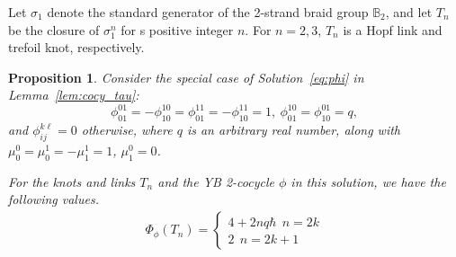 \documentclass[11pt,fleqn]{amsart} %
\newtheorem{proposition}[theorem]{Proposition}
\begin{document}
		
		Let $\sigma_1$ denote the standard generator of the 2-strand braid group ${\mathbb B}_2$,
and let $T_n$ be the closure of $\sigma_1^n$ for s positive integer $n$.
For $n=2,3$, $T_n$ is a Hopf link and trefoil knot, respectively. 
	

\begin{proposition}\label{prop:Tn}
Consider the special case of  Solution~\eqref{eq:phi} in Lemma~\ref{lem:cocy_tau}:
 $$\phi_{01}^{01} = -\phi_{10}^{10} = \phi_{01}^{11} = - \phi_{10}^{11} = 1, \
 \phi_{01}^{10} = \phi_{10}^{01} = q, $$
  and $\phi_{ij}^{k\ell} = 0$ otherwise, where $q$ is an arbitrary real number, along with $\mu_0^0 = \mu_0^1 = -\mu_1^1 = 1$, $\mu_1^0 = 0$.

For the knots and links $T_n$ and the YB 2-cocycle $\phi$ in 
this solution, %
we have the following values. 
\begin{eqnarray*}
				\Phi_{\phi} (T_n) =\begin{cases}
					4+2nq\hbar \ \ n = 2k  \\
					2  \ \ n = 2k+1
				\end{cases}
\end{eqnarray*}
\end{proposition}
\end{document}
